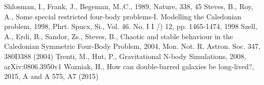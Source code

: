 \documentclass[a4paper,12pt]{article}
\begin{document}
\begin{thebibliography}{1}
Shlosman, I., Frank, J., Begeman, M.,C., 1989, Nature, 338, 45
Steves, B., Roy, A., Some special restricted four-body problems-I. Modelling the Caledonian problem, 1998, Phrt. Spucx, Si., Vol. 46. No. I I /) 12, pp. 1465-1474, 1998
Szell, A., Erdi, B., Sandor, Zs., Steves, B., Chaotic and stable behaviour in the Caledonian Symmetric Four-Body Problem, 2004, Mon. Not. R. Astron. Soc. 347, 380Ð388 (2004)
Trenti, M., Hut, P., Gravitational N-body Simulations, 2008, arXiv:0806.3950v1
Wozniak, H., How can double-barred galaxies be long-lived?, 2015, A and A 575, A7 (2015)
\end{thebibliography}
\end{document}
